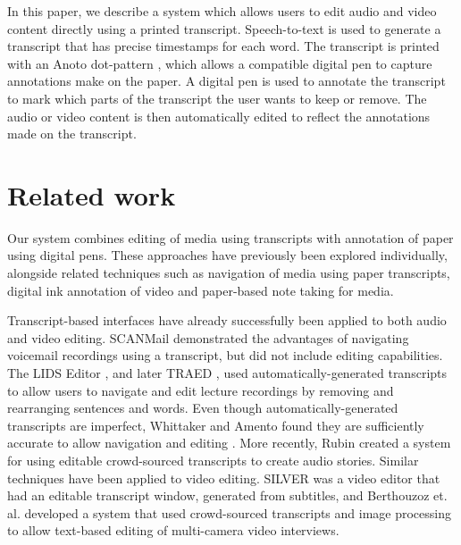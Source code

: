 In this paper, we describe a system which allows users to edit audio and video content directly using a printed
transcript.  Speech-to-text is used to generate a transcript that has precise timestamps for each word.  The transcript
is printed with an Anoto dot-pattern \citep{Fahraeus2003}, which allows a compatible digital pen to capture annotations
make on the paper.  A digital pen is used to annotate the transcript to mark which parts of the transcript the user
wants to keep or remove.  The audio or video content is then automatically edited to reflect the annotations made on
the transcript.




\section{Related work}
Our system combines editing of media using transcripts with annotation of paper using digital pens. These approaches
have previously been explored individually, alongside related techniques such as navigation of media using paper
transcripts, digital ink annotation of video and paper-based note taking for media.

Transcript-based interfaces have already successfully been applied to both audio and video editing. SCANMail
\citep{Whittaker2002} demonstrated the advantages of navigating voicemail recordings using a transcript, but did not
include editing capabilities.  The LIDS Editor \citep{Apperley2002}, and later TRAED \citep{Masoodian2006}, used
automatically-generated transcripts to allow users to navigate and edit lecture recordings by removing and rearranging
sentences and words. Even though automatically-generated transcripts are imperfect, Whittaker and Amento found they are
sufficiently accurate to allow navigation and editing \citep{Whittaker2004}.  More recently, Rubin \citep{Rubin2013}
created a system for using editable crowd-sourced transcripts to create audio stories.  Similar techniques have been
applied to video editing. SILVER \citep{Casares2002} was a video editor that had an editable transcript window,
generated from subtitles, and Berthouzoz et. al.  \citep{Berthouzoz2012} developed a system that used crowd-sourced
transcripts and image processing to allow text-based editing of multi-camera video interviews.

